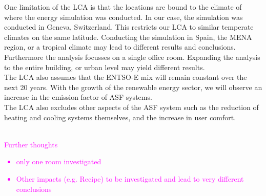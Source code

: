 One limitation of the LCA is that the locations are bound to the climate of where the energy simulation was conducted. In our case, the simulation was conducted in Geneva, Switzerland. This restricts our LCA to similar temperate climates on the same latitude. Conducting the simulation in Spain, the MENA region, or a tropical climate may lead to different results and conclusions. Furthermore the analysis focusses on a single office room. Expanding the analysis to the entire building, or urban level may yield different results.\\
The LCA also assumes that the ENTSO-E mix will remain constant over the next 20 years. With the growth of the renewable energy sector, we will observe an increase in the emission factor of ASF systems. \\
The LCA also excludes other aspects of the ASF system such as the reduction of heating and cooling systems themselves, and the increase in user comfort. 

\textcolor{magenta}{
\\Further thoughts
\begin{itemize}
\item only one room investigated
\item Other impacts (e.g. Recipe) to be investigated and lead to very different conclusions
\end{itemize}
}



